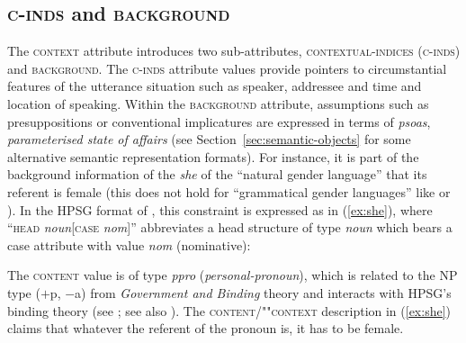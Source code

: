 \documentclass[output=paper
 	        ,biblatex
                ,babelshorthands
                ,newtxmath
                ,draftmode
                ,colorlinks, citecolor=brown
]{langscibook}
\begin{document}
 
\subsection{\textsc{c-inds} and \textsc{background}}
\label{sec:c-inds-background}
 
The \textsc{context}  attribute introduces two sub-attributes, \textsc{contextual-indices} (\textsc{c-inds})   and \textsc{background}. 
%
The \textsc{c-inds} attribute values provide pointers to circumstantial features of the utterance situation such as speaker, addressee and time and location of speaking.
%
Within the \textsc{background} attribute, assumptions such as presuppositions or conventional implicatures are expressed in terms of \emph{psoas}, \emph{parameterised state of affairs} (see Section~\ref{sec:semantic-objects} for some alternative semantic representation formats). 
%
For instance, it is part of the background information of the  \textit{she} of the \enquote{natural gender language}  that its referent is female (this does not hold for \enquote{grammatical gender languages} like  or ).
%
In the HPSG format of \citet[]{Pollard:Sag:1994}, this constraint is expressed as in (\ref{ex:she}), where \enquote{\textsc{head} \textit{noun}[\textsc{case} \textit{nom}]} abbreviates a head structure of type \textit{noun} which bears a case attribute with value \textit{nom} (nominative):
%
\ea \label{ex:she}
\z

The \textsc{content}  value is of type \textit{ppro} (\textit{personal-pronoun}), which is related to the NP type ($+$p, $-$a) from \emph{Government and Binding} theory \citep{Chomsky:1981} and interacts with HPSG's binding theory (see ; see also ).
%
The \textsc{content}/""\textsc{context} description in (\ref{ex:she}) claims that whatever the referent of the pronoun is, it has to be female.
\end{document}
